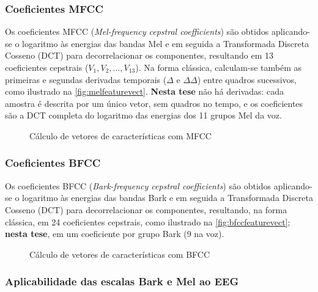 		\subsubsection{Coeficientes MFCC}
			\par Os coeficientes MFCC (\textit{Mel-frequency cepstral coefficients}) são obtidos aplicando-se o logaritmo às energias das bandas Mel e em seguida a Transformada Discreta Cosseno (DCT) \cite{salomon2007data} para decorrelacionar os componentes, resultando em 13 coeficientes cepstrais ($V_1, V_2, \ldots, V_{13}$). Na forma clássica, calculam-se também as primeiras e segundas derivadas temporais ($\Delta$ e $\Delta\Delta$) entre quadros sucessivos, como ilustrado na \autoref{fig:melfeaturevect}. \textbf{Nesta tese} não há derivadas: cada amostra é descrita por um único vetor, sem quadros no tempo, e os coeficientes são a DCT completa do logaritmo das energias dos 11 grupos Mel da voz.

			\begin{figure}[H]
				\centering
				\caption{Cálculo de vetores de características com MFCC}
				\resizebox{0.6\linewidth}{!}{}
				\label{fig:melfeaturevect}
			\end{figure}

		\subsubsection{Coeficientes BFCC}
			\par Os coeficientes BFCC (\textit{Bark-frequency cepstral coefficients}) são obtidos aplicando-se o logaritmo às energias das bandas Bark e em seguida a Transformada Discreta Cosseno (DCT) para decorrelacionar os componentes, resultando, na forma clássica, em 24 coeficientes cepstrais, como ilustrado na \autoref{fig:bfccfeaturevect}; \textbf{nesta tese}, em um coeficiente por grupo Bark (9 na voz).

			\begin{figure}[H]
				\centering
				\caption{Cálculo de vetores de características com BFCC}
				\resizebox{0.6\linewidth}{!}{}
				\label{fig:bfccfeaturevect}
			\end{figure}

		\subsubsection{Aplicabilidade das escalas Bark e Mel ao EEG}
		\label{sec:barkMelEeg}
			\label{sec:escalaEeg}

